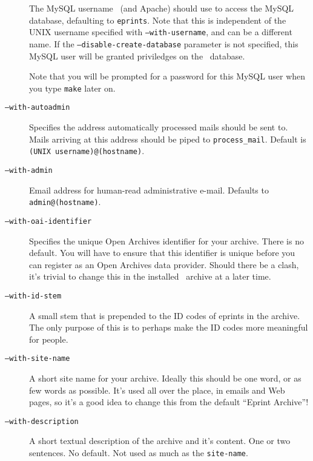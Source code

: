 \begin{description}
The MySQL username \eprints\ (and Apache) should use to access the MySQL database, defaulting to {\tt eprints}. Note that this is independent of the UNIX username specified with {\tt --with-username}, and can be a different name. If the {\tt --disable-create-database} parameter is not specified, this MySQL user will be granted priviledges on the \eprints\ database.

Note that you will be prompted for a password for this MySQL user when you type {\tt make} later on.

\item[{\tt --with-autoadmin}]

Specifies the address automatically processed mails should be sent to. Mails arriving at this address should be piped to {\tt process\_mail}. Default is {\tt (UNIX username)@(hostname)}.

\item[{\tt --with-admin}]

Email address for human-read administrative e-mail. Defaults to {\tt admin@(hostname)}.

\item[{\tt --with-oai-identifier}]

Specifies the unique Open Archives identifier for your archive. There is no default. You will have to ensure that this identifier is unique before you can register as an Open Archives data provider. Should there be a clash, it's trivial to change this in the installed \eprints\ archive at a later time.

\item[{\tt --with-id-stem}]

A small stem that is prepended to the ID codes of eprints in the archive. The only purpose of this is to perhaps make the ID codes more meaningful for people.

\item[{\tt --with-site-name}]

A short site name for your archive. Ideally this should be one word, or as few words as possible. It's used all over the place, in emails and Web pages, so it's a good idea to change this from the default ``Eprint Archive''!

\item[{\tt --with-description}]

A short textual description of the archive and it's content. One or two sentences. No default. Not used as much as the {\tt site-name}.

\end{description}

